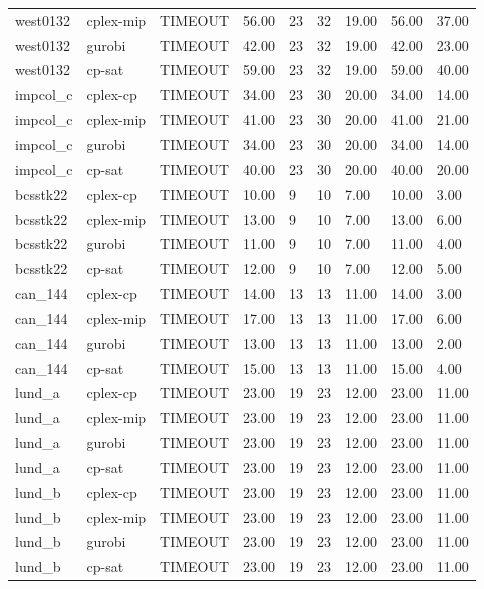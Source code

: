 \begin{tabular}{lllllllll}
west0132 & cplex-mip & TIMEOUT & 56.00 & 23 & 32 & 19.00 & 56.00 & 37.00 \\
west0132 & gurobi & TIMEOUT & 42.00 & 23 & 32 & 19.00 & 42.00 & 23.00 \\
west0132 & cp-sat & TIMEOUT & 59.00 & 23 & 32 & 19.00 & 59.00 & 40.00 \\
impcol\_c & cplex-cp & TIMEOUT & 34.00 & 23 & 30 & 20.00 & 34.00 & 14.00 \\
impcol\_c & cplex-mip & TIMEOUT & 41.00 & 23 & 30 & 20.00 & 41.00 & 21.00 \\
impcol\_c & gurobi & TIMEOUT & 34.00 & 23 & 30 & 20.00 & 34.00 & 14.00 \\
impcol\_c & cp-sat & TIMEOUT & 40.00 & 23 & 30 & 20.00 & 40.00 & 20.00 \\
bcsstk22 & cplex-cp & TIMEOUT & 10.00 & 9 & 10 & 7.00 & 10.00 & 3.00 \\
bcsstk22 & cplex-mip & TIMEOUT & 13.00 & 9 & 10 & 7.00 & 13.00 & 6.00 \\
bcsstk22 & gurobi & TIMEOUT & 11.00 & 9 & 10 & 7.00 & 11.00 & 4.00 \\
bcsstk22 & cp-sat & TIMEOUT & 12.00 & 9 & 10 & 7.00 & 12.00 & 5.00 \\
can\_144 & cplex-cp & TIMEOUT & 14.00 & 13 & 13 & 11.00 & 14.00 & 3.00 \\
can\_144 & cplex-mip & TIMEOUT & 17.00 & 13 & 13 & 11.00 & 17.00 & 6.00 \\
can\_144 & gurobi & TIMEOUT & 13.00 & 13 & 13 & 11.00 & 13.00 & 2.00 \\
can\_144 & cp-sat & TIMEOUT & 15.00 & 13 & 13 & 11.00 & 15.00 & 4.00 \\
lund\_a & cplex-cp & TIMEOUT & 23.00 & 19 & 23 & 12.00 & 23.00 & 11.00 \\
lund\_a & cplex-mip & TIMEOUT & 23.00 & 19 & 23 & 12.00 & 23.00 & 11.00 \\
lund\_a & gurobi & TIMEOUT & 23.00 & 19 & 23 & 12.00 & 23.00 & 11.00 \\
lund\_a & cp-sat & TIMEOUT & 23.00 & 19 & 23 & 12.00 & 23.00 & 11.00 \\
lund\_b & cplex-cp & TIMEOUT & 23.00 & 19 & 23 & 12.00 & 23.00 & 11.00 \\
lund\_b & cplex-mip & TIMEOUT & 23.00 & 19 & 23 & 12.00 & 23.00 & 11.00 \\
lund\_b & gurobi & TIMEOUT & 23.00 & 19 & 23 & 12.00 & 23.00 & 11.00 \\
lund\_b & cp-sat & TIMEOUT & 23.00 & 19 & 23 & 12.00 & 23.00 & 11.00 \\

\end{tabular}
